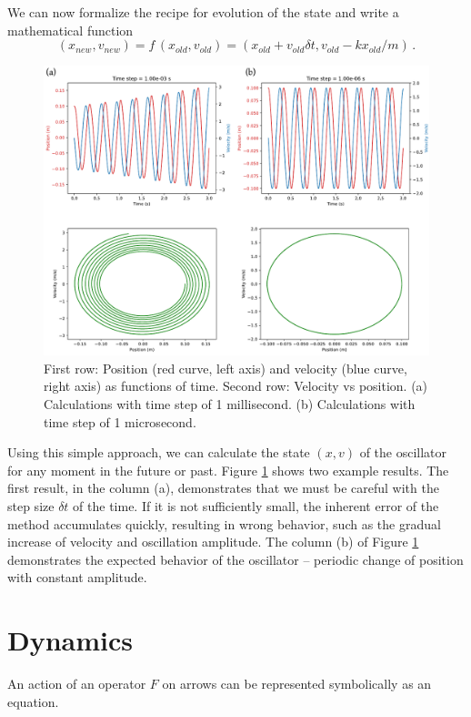 We can now formalize the recipe for evolution of the state and write a
mathematical function
\[
(x_{new}, v_{new}) = f\, (x_{old}, v_{old}) = (x_{old}+v_{old}\delta
t, v_{old} - kx_{old}/m)\,.
\]
\begin{figure}[htbp]
	\centering
	\includegraphics[scale=0.9]{newtonianStateEvolution}
	\caption{First row: Position (red curve, left axis) and velocity (blue
		curve, right axis) as functions of time. Second row: Velocity vs position.
		(a) Calculations with time step of 1 millisecond. (b) Calculations
		with time step of 1 microsecond.}
	\label{fig:newtonianStateEvolution}
\end{figure}

Using this simple approach, we can calculate the state $(x, v)$ of the
oscillator for any moment in the future or past. Figure
\ref{fig:newtonianStateEvolution} shows two example results. The first
result, in the column (a), demonstrates that we must be careful with
the step size $\delta t$ of the time. If it is not sufficiently small,
the inherent error of the method accumulates quickly, resulting in
wrong behavior, such as the gradual increase of velocity and
oscillation amplitude. The column (b) of Figure
\ref{fig:newtonianStateEvolution} demonstrates the expected behavior
of the oscillator -- periodic change of position with constant amplitude.

\section{Dynamics}\label{sec:Dynamics}
An action of an operator $F$ on arrows can be represented symbolically
as an equation.

